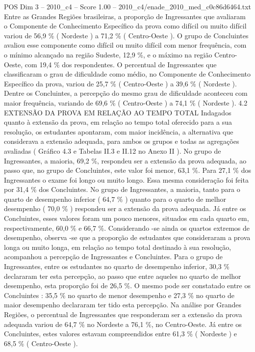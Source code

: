 \begin{textsample}{POS Dim 3 – 2010\_c4 – Score 1.00 – 2010\_c4/enade\_2010\_med\_c0c86d6464.txt}
Entre as Grandes Regiões brasileiras, a proporção de Ingressantes que avaliaram o Componente de Conhecimento Específico da prova como difícil ou muito difícil variou de 56,9 \% ( Nordeste ) a 71,2 \% ( Centro-Oeste ).
O grupo de Concluintes avaliou esse componente como difícil ou muito difícil com menor frequência, com o mínimo alcançado na região Sudeste, 12,9 \%, e o máximo na região Centro-Oeste, com 19,4 \% dos respondentes.
O percentual de Ingressantes que classificaram o grau de dificuldade como médio, no Componente de Conhecimento Específico da prova, variou de 25,7 \% ( Centro-Oeste ) a 39,6 \% ( Nordeste ).
Dentre os Concluintes, a percepção do mesmo grau de dificuldade aconteceu com maior frequência, variando de 69,6 \% ( Centro-Oeste ) a 74,1 \% ( Nordeste ). 4.2 EXTENSÃO DA PROVA EM RELAÇÃO AO TEMPO TOTAL Indagados quanto à extensão da prova, em relação ao tempo total oferecido para a sua resolução, os estudantes apontaram, com maior incidência, a alternativa que considerava a extensão adequada, para ambos os grupos e todas as agregações avaliadas ( Gráfico 4.3 e Tabelas II.3 e II.12 no Anexo II ).
No grupo de Ingressantes, a maioria, 69,2 \%, respondeu ser a extensão da prova adequada, ao passo que, no grupo de Concluintes, este valor foi menor, 63,1 \%.
Para 27,1 \% dos Ingressantes o exame foi longo ou muito longo.
Essa mesma consideração foi feita por 31,4 \% dos Concluintes.
No grupo de Ingressantes, a maioria, tanto para o quarto de desempenho inferior ( 64,7 \% ) quanto para o quarto de melhor desempenho ( 70,0 \% ) respondeu ser a extensão da prova adequada.
Já entre os Concluintes, esses valores foram um pouco menores, situados em cada quarto em, respectivamente, 60,0 \% e 66,7 \%.
Considerando -se ainda os quartos extremos de desempenho, observa -se que a proporção de estudantes que consideraram a prova longa ou muito longa, em relação ao tempo total destinado à sua resolução, acompanhou a percepção de Ingressantes e Concluintes.
Para o grupo de Ingressantes, entre os estudantes no quarto de desempenho inferior, 30,3 \% declararam ter esta percepção, ao passo que entre aqueles no quarto de melhor desempenho, esta proporção foi de 26,5 \%.
O mesmo pode ser constatado entre os Concluintes : 35,5 \% no quarto de menor desempenho e 27,3 \% no quarto de maior desempenho declararam ter tido esta percepção.
Na análise por Grandes Regiões, o percentual de Ingressantes que responderam ser a extensão da prova adequada variou de 64,7 \% no Nordeste a 76,1 \%, no Centro-Oeste.
Já entre os Concluintes, estes valores estavam compreendidos entre 61,3 \% ( Nordeste ) e 68,5 \% ( Centro-Oeste ).

\end{textsample}
